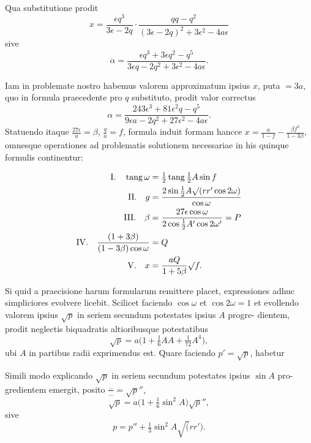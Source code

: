\documentclass[12pt,a4paper]{article}
\newcommand{\tang}{\mathop{\mathrm{tang}}\nolimits}
\begin{document}
Qua substitutione prodit
\[
x = \frac{\epsilon q^3}{3\epsilon - 2q}\cdot\frac{qq - q^2}{(3\epsilon - 2q)^2 + 3\epsilon^2 - 4a\epsilon}
\]
sive
\[
\alpha = \frac{\epsilon q^3 + 3\epsilon q^2 - q^5}{3\epsilon q - 2q^2 + 3\epsilon^2 - 4a\epsilon}.
\]

Iam in problemate nostro habemus valorem approximatum ipsius $x$, puta $= 3a$,
quo in formula praecedente pro $q$ substituto, prodit valor correctus
\[
\alpha = \frac{243\epsilon^3 + 81\epsilon^2 q - q^5}{9\epsilon a - 2q^2 + 27\epsilon^2 - 4a\epsilon}.
\]
Statuendo itaque $\frac{27\epsilon}{a} = \beta$, $\frac{q}{a} = f$, formula induit formam hancce $x =
\frac{a}{1 - f} - \frac{\beta f^3}{1 - 3\beta}$, omnesque operationes ad problematis solutionem necessariae in
his quinque formulis continentur:

\begin{align*}
\text{I.\quad} \tang\omega &= \tfrac{1}{2}\tang\tfrac{1}{2}A\sin f \\
\text{II.\quad} g &= \frac{2\sin\tfrac{1}{2}A\surd(rr'\cos 2\omega)}{\cos\omega} \\
\text{III.\quad} \beta &= \frac{27\epsilon\cos\omega}{2\cos\tfrac{1}{2}A'\cos 2\omega'} = P \\
\text{IV.\quad} \frac{(1 + 3\beta)}{(1 - 3\beta)\cos\omega} &= Q \\
\text{V.\quad} x &= \frac{aQ}{1 + 5\beta}\surd f.
\end{align*}

Si quid a praecisione harum formularum remittere placet, expressiones
adhuc simpliciores evolvere licebit. Scilicet faciendo $\cos\omega$ et $\cos 2\omega = 1$ et
evollendo valorem ipsius $\surd p$ in seriem secundum potestates ipsius $A$ progre-
dientem, prodit neglectis biquadratis altioribusque potestatibus
\begin{equation}\tag{VI}
\surd p = a\bigl(1 + \tfrac{1}{6}AA + \tfrac{1}{72}A^4\bigr),
\end{equation}
ubi $A$ in partibus radii exprimendus est. Quare faciendo $p' = \surd p$, habetur

Simili modo explicando $\surd p$ in seriem secundum potestates ipsius $\sin A$ pro-
gredientem emergit, posito $\frac{\dots}{\dots} = \surd p''$,
\begin{equation}\tag{VII}
\surd p = a\bigl(1 + \tfrac{1}{6}\sin^2\!A\bigr)\surd p'',
\end{equation}
sive
\begin{equation}\tag{VIII}
p = p'' + \tfrac{1}{3}\sin^2\!A\surd(rr').
\end{equation}
\end{document}
